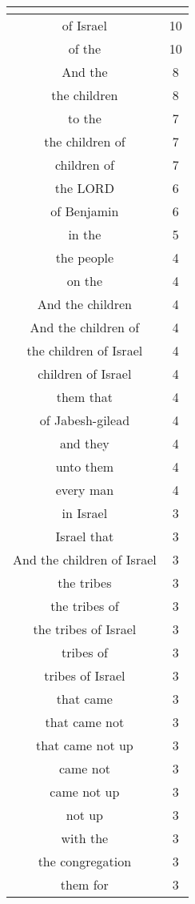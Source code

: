 \begin{center}
\begin{longtable}{|c|c|}
\hline \multicolumn{2}{c}{{ }} \\ \hline
\endfoot 
of Israel & 10\\ \hline 
of the & 10\\ \hline 
And the & 8\\ \hline 
the children & 8\\ \hline 
to the & 7\\ \hline 
the children of & 7\\ \hline 
children of & 7\\ \hline 
the LORD & 6\\ \hline 
of Benjamin & 6\\ \hline 
in the & 5\\ \hline 
the people & 4\\ \hline 
on the & 4\\ \hline 
And the children & 4\\ \hline 
And the children of & 4\\ \hline 
the children of Israel & 4\\ \hline 
children of Israel & 4\\ \hline 
them that & 4\\ \hline 
of Jabesh-gilead & 4\\ \hline 
and they & 4\\ \hline 
unto them & 4\\ \hline 
every man & 4\\ \hline 
in Israel & 3\\ \hline 
Israel that & 3\\ \hline 
And the children of Israel & 3\\ \hline 
the tribes & 3\\ \hline 
the tribes of & 3\\ \hline 
the tribes of Israel & 3\\ \hline 
tribes of & 3\\ \hline 
tribes of Israel & 3\\ \hline 
that came & 3\\ \hline 
that came not & 3\\ \hline 
that came not up & 3\\ \hline 
came not & 3\\ \hline 
came not up & 3\\ \hline 
not up & 3\\ \hline 
with the & 3\\ \hline 
the congregation & 3\\ \hline 
them for & 3\\ \hline 

\end{longtable}
\end{center}
